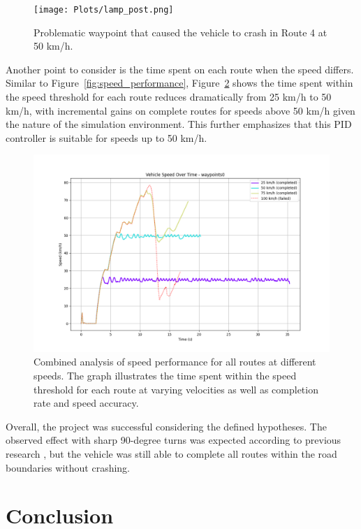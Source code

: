 \documentclass[conference]{IEEEtran}
\begin{document}
\begin{figure}[h]
    \centering
    \texttt{[image: Plots/lamp\_post.png]}
    \caption{Problematic waypoint that caused the vehicle to crash in Route 4 at 50 km/h.}
    \label{fig:lamp_post}
\end{figure}

Another point to consider is the time spent on each route when the speed differs. Similar to Figure~\ref{fig:speed_performance}, Figure~\ref{fig:combined} shows the time spent within the speed threshold for each route reduces dramatically from 25 km/h to 50 km/h, with incremental gains on complete routes for speeds above 50 km/h given the nature of the simulation environment. This further emphasizes that this PID controller is suitable for speeds up to 50 km/h.

\begin{figure}[h]
    \centering
    \includegraphics[width=\columnwidth]{Plots/combined_speed_performance_waypoints0.png}
    \caption{Combined analysis of speed performance for all routes at different speeds. The graph illustrates the time spent within the speed threshold for each route at varying velocities as well as completion rate and speed accuracy.}
    \label{fig:combined}
\end{figure}

Overall, the project was successful considering the defined hypotheses. The observed effect with sharp 90-degree turns was expected according to previous research \cite{10.25165/j.ijabe.20241701.7296}, but the vehicle was still able to complete all routes within the road boundaries without crashing.

\section{Conclusion}
\end{document}
